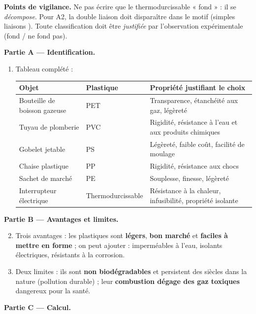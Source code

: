 \documentclass[11pt]{article}
\begin{document}
\begin{corrige}
\textbf{Points de vigilance.} Ne pas écrire que le thermodurcissable « fond » : il se \emph{décompose}. Pour A2, la double liaison  doit disparaître dans le motif (simples liaisons ). Toute classification doit être \emph{justifiée} par l'observation expérimentale (fond / ne fond pas).
\end{corrige}

\begin{corrige}
\textbf{Partie A — Identification.}
\begin{enumerate}
\item Tableau complété :
\begin{center}
\begin{tabularx}{\linewidth}{|l|X|X|}
\hline
\rowcolor{popblueL} \textbf{Objet} & \textbf{Plastique} & \textbf{Propriété justifiant le choix} \\
\hline
Bouteille de boisson gazeuse & PET & Transparence, étanchéité aux gaz, légèreté \\
\hline
Tuyau de plomberie & PVC & Rigidité, résistance à l'eau et aux produits chimiques \\
\hline
Gobelet jetable & PS & Légèreté, faible coût, facilité de moulage \\
\hline
Chaise plastique & PP & Rigidité, résistance aux chocs \\
\hline
Sachet de marché & PE & Souplesse, finesse, légèreté \\
\hline
Interrupteur électrique & Thermodurcissable & Résistance à la chaleur, infusibilité, propriété isolante \\
\hline
\end{tabularx}
\end{center}
\end{enumerate}
\textbf{Partie B — Avantages et limites.}
\begin{enumerate}
\setcounter{enumi}{1}
\item Trois avantages : les plastiques sont \textbf{légers}, \textbf{bon marché} et \textbf{faciles à mettre en forme} ; on peut ajouter : imperméables à l'eau, isolants électriques, résistants à la corrosion.
\item Deux limites : ils sont \textbf{non biodégradables} et persistent des siècles dans la nature (pollution durable) ; leur \textbf{combustion dégage des gaz toxiques} dangereux pour la santé.
\end{enumerate}
\textbf{Partie C — Calcul.}
\begin{enumerate}

\end{enumerate}
\end{corrige}
\end{document}
